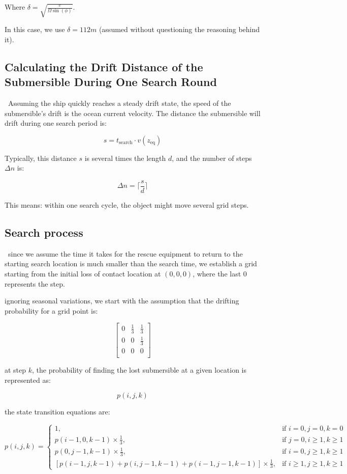 Where \( \delta = \sqrt{\frac{v}{\Omega \sin(\phi)}} \).

In this case, we use \( \delta = 112m \) (assumed without questioning the reasoning behind it).


\subsection{Calculating the Drift Distance of the Submersible During One Search Round}
\
\indent Assuming the ship quickly reaches a steady drift state, the speed of the submersible’s drift is the ocean current velocity. The distance the submersible will drift during one search period is:

\[
	s = t_{\text{search}} \cdot v(z_{\text{eq}})
\]

Typically, this distance \( s \) is several times the length \( d \), and the number of steps \( \Delta n \) is:

\[
	\Delta n = \lceil \frac{s}{d} \rceil
\]

This means: within one search cycle, the object might move several grid steps.


\subsection{Search process}
\
\indent since we assume the time it takes for the rescue equipment to return to the starting search location is much smaller than the search time, we establish a grid starting from the initial loss of contact location at \( (0, 0, 0) \), where the last 0 represents the step.

ignoring seasonal variations, we start with the assumption that the drifting probability for a grid point is:

\[
	\begin{bmatrix}
		0 & \frac{1}{3} & \frac{1}{3} \\
		0 & 0           & \frac{1}{3} \\
		0 & 0           & 0           \\
	\end{bmatrix}
\]

\noindent at step \( k \), the probability of finding the lost submersible at a given location is represented as:

\[
	p(i,j,k)
\]

\noindent the state transition equations are:

\[
	p(i,j,k) =
	\begin{cases}
		1,                                                                              & \text{if } i=0, j=0, k=0                \\
		p(i-1,0,k-1) \times \frac{1}{3},                                                & \text{if } j=0, i \geq 1, k \geq 1      \\
		p(0,j-1,k-1) \times \frac{1}{3},                                                & \text{if } i=0, j \geq 1, k \geq 1      \\
		\left[ p(i-1,j,k-1) + p(i,j-1,k-1) + p(i-1,j-1,k-1) \right] \times \frac{1}{3}, & \text{if } i \geq 1, j \geq 1, k \geq 1
	\end{cases}
\]

